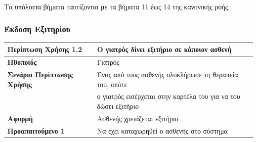 \documentclass{article}
\newcommand\T{\rule{0pt}{2.6ex}}       %
\newcommand\B{\rule[-1.2ex]{0pt}{0pt}}
\begin{document}
\par Τα υπόλοιπα βήματα ταυτίζονται με τα βήματα 11 έως 14 της κανονικής ροής.

\subsubsection{Έκδοση Εξιτηρίου}
 
 \begin{center}
     \begin{tabular}{|l|l|}
     \hline
      \textbf{Περίπτωση Χρήσης 1.2} & Ο γιατρός δίνει εξιτήριο σε κάποιον ασθενή \T\B \\ 
      \hline
      \textbf{Ηθοποιός} & Γιατρός \T\B \\
      \hline
      \textbf{Σενάριο Περίπτωσης Χρήσης} & Ένας από τους ασθενής ολοκλήρωσε τη θεραπεία του, οπότε \T\\& ο γιατρός εισέρχεται στην καρτέλα του για να του δώσει εξιτήριο \B \\
      \hline
      \textbf{Αφορμή} & Ασθενής χρειάζεται εξιτήριο \T\B \\
      \hline
      \textbf{Προαπαιτούμενο 1} & Να έχει καταχωρηθεί ο ασθενής στο σύστημα \T\B \\
      \hline
     \end{tabular}
 \end{center}
 
\newpage
\end{document}
